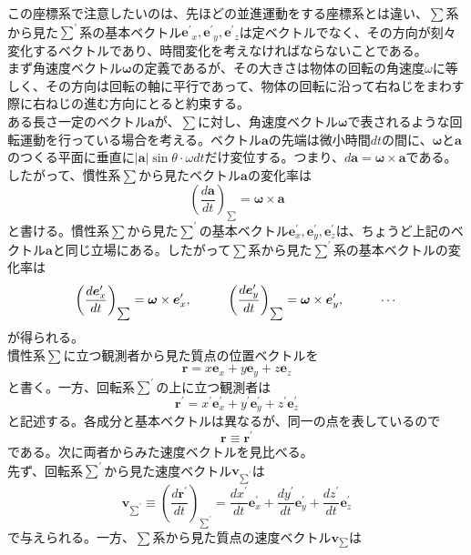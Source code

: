 \documentclass{jsarticle}
\begin{document}
この座標系で注意したいのは、先ほどの並進運動をする座標系とは違い、\(\sum\)系から見た\(\sum^{\prime}\)系の基本ベクトル\(\bm{e^{\prime}}_{x},\bm{e^{\prime}}_{y},\bm{e^{\prime}}_{z}\)は定ベクトルでなく、その方向が刻々変化するベクトルであり、時間変化を考えなければならないことである。\\
まず角速度ベクトル\(\bm{\omega}\)の定義であるが、その大きさは物体の回転の角速度\(\omega\)に等しく、その方向は回転の軸に平行であって、物体の回転に沿って右ねじをまわす際に右ねじの進む方向にとると約束する。\\
ある長さ一定のベクトル\(\bm{a}\)が、\(\sum\)に対し、角速度ベクトル\(\bm{\omega}\)で表されるような回転運動を行っている場合を考える。ベクトル\(\bm{a}\)の先端は微小時間\(dt\)の間に、\(\bm{\omega}\)と\(\bm{a}\)のつくる平面に垂直に\(|\bm{a}|\sin\theta\cdot\omega dt\)だけ変位する。つまり、\(d\bm{a}=\bm{\omega}\times\bm{a}\)である。したがって、慣性系\(\sum\)から見たベクトル\(\bm{a}\)の変化率は
\[\left(\frac{d\bm{a}}{dt}\right)_{\sum}=\bm{\omega}\times\bm{a}\]
と書ける。慣性系\(\sum\)から見た\(\sum^{\prime}\)の基本ベクトル\(\bm{e}_{x}^{\prime},\bm{e}_{y}^{\prime},\bm{e}_{z}^{\prime}\)は、ちょうど上記のベクトル\(\bm{a}\)と同じ立場にある。したがって\(\sum\)系から見た\(\sum^{\prime}\)系の基本ベクトルの変化率は
\[\left(\frac{d\bm{e}_{x}^{\prime}}{dt}\right)_{\sum}=\bm{\omega}\times\bm{e}_{x}^{\prime},\hspace{10mm}\left(\frac{d\bm{e}_{y}^{\prime}}{dt}\right)_{\sum}=\bm{\omega}\times\bm{e}_{y}^{\prime},\hspace{10mm}\cdots\]
が得られる。\\
慣性系\(\sum\)に立つ観測者から見た質点の位置ベクトルを
\[\bm{r}=x\bm{e}_{x}+y\bm{e}_{y}+z\bm{e}_{z}\]
と書く。一方、回転系\(\sum^{\prime}\)の上に立つ観測者は
\[\bm{r}^{\prime}=x^{\prime}\bm{e}_{x}^{\prime}+y^{\prime}\bm{e}_{y}^{\prime}+z^{\prime}\bm{e}_{z}^{\prime}\]
と記述する。各成分と基本ベクトルは異なるが、同一の点を表しているので
\[\bm{r}\equiv\bm{r}^{\prime}\]
である。次に両者からみた速度ベクトルを見比べる。\\
先ず、回転系\(\sum^{\prime}\)から見た速度ベクトル\(\bm{v}_{\sum^{\prime}}\)は
\[\bm{v}_{\sum^{\prime}}\equiv\left(\frac{d\bm{r}^{\prime}}{dt}\right)_{\sum^{\prime}}=\frac{dx^{\prime}}{dt}\bm{e}_{x}^{\prime}+\frac{dy^{\prime}}{dt}\bm{e}_{y}^{\prime}+\frac{dz^{\prime}}{dt}\bm{e}_{z}^{\prime}\]
で与えられる。一方、\(\sum\)系から見た質点の速度ベクトル\(\bm{v}_{\sum}\)は
\end{document}
